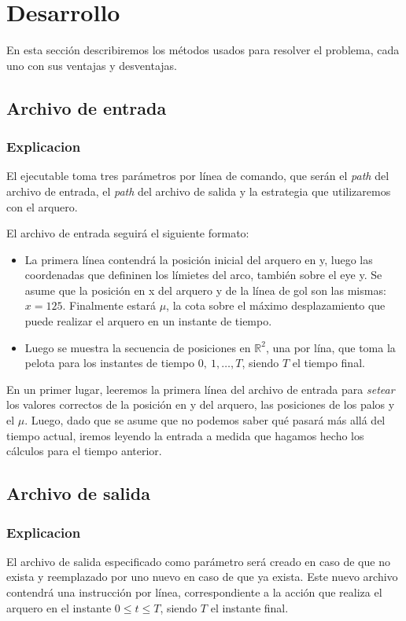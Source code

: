 \section{Desarrollo}
En esta sección describiremos los métodos usados para resolver el problema, cada uno con sus
ventajas y desventajas.

\subsection{Archivo de entrada}
\subsubsection{Explicacion}
El ejecutable toma tres parámetros por línea de comando, que serán el \textit{path} del archivo de entrada, el \textit{path} del archivo de salida y la estrategia que utilizaremos con el arquero.

El archivo de entrada seguirá el siguiente formato:
\begin{itemize}
	\item La primera línea contendrá la posición inicial del arquero en y, luego las coordenadas que defininen los límietes del arco, también sobre el eye y. Se asume que la posición en x del arquero y de la línea de gol son las mismas: $x = 125$. Finalmente estará $\mu$, la cota sobre el máximo desplazamiento que puede realizar el arquero en un instante de tiempo.
	\item Luego se muestra la secuencia de posiciones en $\mathbb{R}^2$, una por lína, que toma la pelota para los instantes de tiempo $0, \ 1, \ldots, T$, siendo $T$ el tiempo final.
\end{itemize}

En un primer lugar, leeremos la primera línea del archivo de entrada para \textit{setear} los valores correctos de la posición en y del arquero, las posiciones de los palos y el $\mu$. Luego, dado que se asume que no podemos saber qué pasará más allá del tiempo actual, iremos leyendo la entrada a medida que hagamos hecho los cálculos para el tiempo anterior.

\subsection{Archivo de salida}
\subsubsection{Explicacion}
El archivo de salida especificado como parámetro será creado en caso de que no exista y reemplazado por uno nuevo en caso de que ya exista. Este nuevo archivo contendrá una instrucción por línea, correspondiente a la acción que realiza el arquero en el instante $0 \leq t \leq T$, siendo $T$ el instante final.

